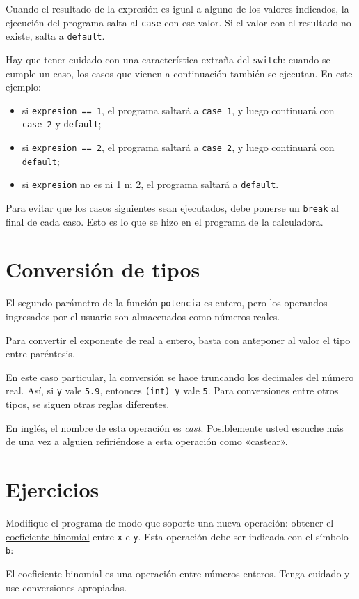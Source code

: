 Cuando el resultado de la expresión es igual a alguno de los valores
indicados, la ejecución del programa salta al \lstinline!case! con ese
valor. Si el valor con el resultado no existe, salta a
\lstinline!default!.

Hay que tener cuidado con una característica extraña del
\lstinline!switch!: cuando se cumple un caso, los casos que vienen a
continuación también se ejecutan. En este ejemplo:

\begin{itemize}
\item
  si \lstinline!expresion == 1!, el programa saltará a
  \lstinline!case 1!, y luego continuará con \lstinline!case 2! y
  \lstinline!default!;
\item
  si \lstinline!expresion == 2!, el programa saltará a
  \lstinline!case 2!, y luego continuará con \lstinline!default!;
\item
  si \lstinline!expresion! no es ni 1 ni 2, el programa saltará a
  \lstinline!default!.
\end{itemize}

Para evitar que los casos siguientes sean ejecutados, debe ponerse un
\lstinline!break! al final de cada caso. Esto es lo que se hizo en el
programa de la calculadora.

\section{Conversión de tipos}

El segundo parámetro de la función \lstinline!potencia! es entero, pero
los operandos ingresados por el usuario son almacenados como números
reales.

Para convertir el exponente de real a entero, basta con anteponer al
valor el tipo entre paréntesis.

En este caso particular, la conversión se hace truncando los decimales
del número real. Así, si \lstinline!y! vale \lstinline!5.9!, entonces
\lstinline!(int) y! vale \lstinline!5!. Para conversiones entre otros
tipos, se siguen otras reglas diferentes.

En inglés, el nombre de esta operación es \emph{cast}. Posiblemente
usted escuche más de una vez a alguien refiriéndose a esta operación
como «castear».

\section{Ejercicios}

Modifique el programa de modo que soporte una nueva operación: obtener
el \href{http://es.wikipedia.org/wiki/Coeficiente\_binomial}{coeficiente
binomial} entre \lstinline!x! e \lstinline!y!. Esta operación debe ser
indicada con el símbolo \lstinline!b!:

El coeficiente binomial es una operación entre números enteros. Tenga
cuidado y use conversiones apropiadas.

